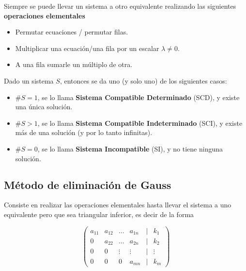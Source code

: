 \begin{observation} 
	
Siempre se puede llevar un sistema a otro equivalente realizando las siguientes \textbf{operaciones elementales}

\begin{itemize}
\item Permutar ecuaciones / permutar filas.
\item Multiplicar una ecuación/una fila por un escalar $\lambda \neq 0$.
\item A una fila sumarle un múltiplo de otra.
\end{itemize}

\end{observation}

\begin{definition} 
Dado un sistema $S$, entonces se da uno (y solo uno) de los siguientes casos:

\begin{itemize}
\item $\# S = 1$, se lo llama \textbf{Sistema Compatible Determinado} (SCD), y existe una única solución. 
\item $\# S > 1$, se lo llama \textbf{Sistema Compatible Indeterminado} (SCI), y existe más de una solución (y por lo tanto infinitas). 
\item $\# S = 0$, se lo llama \textbf{Sistema Incompatible} (SI), y no tiene ninguna solución. 
\end{itemize}
\end{definition}

\subsection{Método de eliminación de Gauss} 

Consiste en realizar las operaciones elementales hasta llevar el sistema a uno equivalente pero que sea triangular inferior, es decir de la forma

$$ \begin{pmatrix} 
a_{11} & a_{12} & \ldots & a_{1n} & | & k_1 \\
0 & a_{22} & \ldots & a_{2n} & | & k_2 \\
0 & 0 & \vdots & \vdots & | & \vdots \\
0 & 0 & 0 & a_{mn} & | & k_m 
\end{pmatrix}$$

